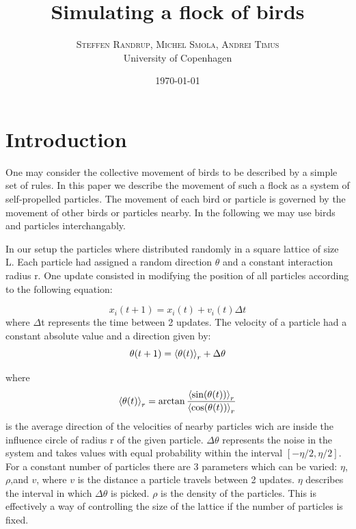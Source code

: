 \documentclass[twoside,twocolumn]{article}
\title{Simulating a flock of birds} %
\author{%
\textsc{Steffen Randrup, Michel Smola, Andrei Timus}\\[1ex] %
\normalsize University of Copenhagen \\ %
}
\date{\today} %
\begin{document}
\maketitle


\section{Introduction}

One may consider the collective movement of birds to be described by a simple set of rules.
In this paper we describe the movement of such a flock as a system of self-propelled particles.
The movement of each bird or particle is governed by the movement of other birds or particles nearby.
In the following we may use birds and particles interchangably.

In our setup the particles where distributed randomly in a square lattice of size L.
Each particle had assigned a random direction $\theta$ and a constant interaction radius r.
One update consisted in modifying the position of all particles according to the following equation:

\begin{equation}
x_{i}(t+1)=x_i(t)+v_i(t)\Delta t
\end{equation}
where $\Delta$t represents the time between 2 updates.
The velocity of a particle had a constant absolute value and a direction given by:
\begin{equation}
\theta(t+1)=\braket{\theta(t)}_r+\Delta \theta
\end{equation} 

where 
\begin{equation}
\braket{\theta(t)}_r=\arctan\frac{\braket{\sin(\theta(t))}_r}{\braket{\cos(\theta(t))}_r}
\end{equation}
is the average direction of the velocities of nearby particles wich are inside the influence circle of radius r of the given particle. $\Delta \theta$ represents the noise in the system and takes values with equal probability within the interval $[-\eta/2,\eta/2]$. For a constant number of particles there are 3 parameters which can be varied: $\eta$,$\rho$,and $v$, where $v$ is the distance a particle travels between 2 updates. $\eta$ describes the interval in which $\Delta\theta$ is picked. $\rho$ is the density of the particles. This is effectively a way of controlling the size of the lattice if the number of particles is fixed.
\end{document}
